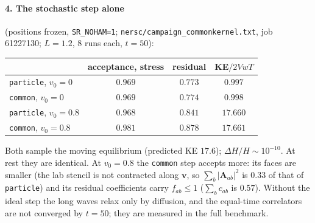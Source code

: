 \documentclass[11pt,aps,preprint,nofootinbib,superscriptaddress,tightenlines]{revtex4-2}
\let\oldparagraph\paragraph
\renewcommand{\paragraph}{\par\bigskip\oldparagraph}
\begin{document}
\paragraph{4. The stochastic step alone} (positions frozen, \texttt{SR\_NOHAM=1}; \texttt{nersc/campaign\_commonkernel.txt}, job 61227130;
$L=1.2$, 8 runs each, $t=50$):
\begin{center}
\begin{tabular}{lccc}
\hline
 & acceptance, stress & residual & KE$/2VwT$ \\ \hline
\texttt{particle}, $v_0=0$ & $0.969$ & $0.773$ & $0.997$ \\
\texttt{common}, $v_0=0$ & $0.969$ & $0.774$ & $0.998$ \\
\texttt{particle}, $v_0=0.8$ & $0.968$ & $0.841$ & $17.660$ \\
\texttt{common}, $v_0=0.8$ & $0.981$ & $0.878$ & $17.661$ \\
\hline
\end{tabular}
\end{center}
Both sample the moving equilibrium (predicted KE $17.6$); $\Delta H/H\sim10^{-10}$.  At rest they are identical.  At $v_0=0.8$
the \texttt{common} step accepts more: its faces are smaller (the lab stencil is not contracted along $\bm v$, so
$\sum_b|\bm A_{ab}|^2$ is $0.33$ of that of \texttt{particle}) and its residual coefficients carry $f_{ab}\le1$ ($\sum_bc_{ab}$ is $0.57$).  Without
the ideal step the long waves relax only by diffusion, and the equal-time correlators are not converged
by $t=50$; they are measured in the full benchmark.
\end{document}
